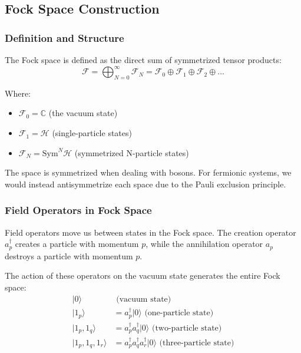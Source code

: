 \subsection{Fock Space Construction}

\subsubsection{Definition and Structure}

The Fock space is defined as the direct sum of symmetrized tensor products:
\begin{equation}
\mathcal{F} = \bigoplus_{N=0}^{\infty} \mathcal{F}_N = \mathcal{F}_0 \oplus \mathcal{F}_1 \oplus \mathcal{F}_2 \oplus \ldots
\end{equation}

Where:
\begin{itemize}
\item $\mathcal{F}_0 = \mathbb{C}$ (the vacuum state)
\item $\mathcal{F}_1 = \mathcal{H}$ (single-particle states)
\item $\mathcal{F}_N = \text{Sym}^N \mathcal{H}$ (symmetrized N-particle states)
\end{itemize}

The space is symmetrized when dealing with bosons. For fermionic systems, we would instead antisymmetrize each space due to the Pauli exclusion principle.

\subsubsection{Field Operators in Fock Space}

Field operators move us between states in the Fock space. The creation operator $a_p^\dagger$ creates a particle with momentum $p$, while the annihilation operator $a_p$ destroys a particle with momentum $p$.

The action of these operators on the vacuum state generates the entire Fock space:
\begin{align}
|0\rangle &\text{ (vacuum state)} \\
|1_p\rangle &= a_p^\dagger|0\rangle \text{ (one-particle state)} \\
|1_p, 1_q\rangle &= a_p^\dagger a_q^\dagger|0\rangle \text{ (two-particle state)} \\
|1_p, 1_q, 1_r\rangle &= a_p^\dagger a_q^\dagger a_r^\dagger|0\rangle \text{ (three-particle state)}
\end{align}

